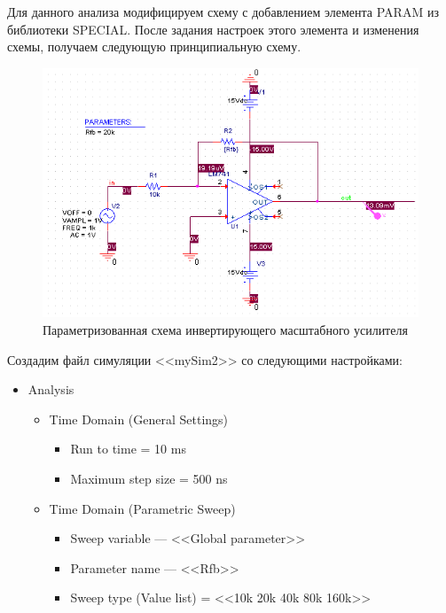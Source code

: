 \documentclass[utf8x, 12pt]{G7-32}
\begin{document}
Для данного анализа модифицируем схему с добавлением элемента PARAM из библиотеки SPECIAL. После задания настроек этого элемента и изменения схемы, получаем следующую принципиальную схему.

\begin{figure}[h]
	\begin{center}
		\includegraphics[width=12cm]{img/shema_2}
	\end{center}
	\vspace{-5mm}\caption{Параметризованная схема инвертирующего масштабного усилителя}
\end{figure}	

Создадим файл симуляции <<mySim2>> со следующими настройками:

\begin{itemize}
	\item Analysis
	\begin{itemize}	
		\item Time Domain (General Settings)
		\begin{itemize}	
			\item Run to time = 10 ms
			\item Maximum step size = 500 ns
		\end{itemize}
		\item Time Domain (Parametric Sweep)
		\begin{itemize}	
			\item Sweep variable --- <<Global parameter>>
			\item Parameter name --- <<Rfb>>
			\item Sweep type (Value list) = <<10k 20k 40k 80k 160k>>
		\end{itemize}
	\end{itemize}
\end{itemize}
\end{document}
